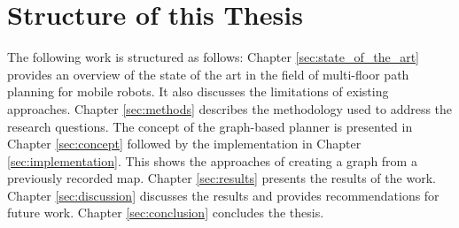 \section{Structure of this Thesis}
\label{sec:structure}
The following work is structured as follows: Chapter \ref{sec:state_of_the_art} provides an overview of the state of the art in the field of multi-floor path planning for mobile robots. It also discusses the limitations of existing approaches. Chapter \ref{sec:methods} describes the methodology used to address the research questions. The concept of the graph-based planner is presented in Chapter \ref{sec:concept} followed by the implementation in Chapter \ref{sec:implementation}. This shows the approaches of creating a graph from a previously recorded map. Chapter \ref{sec:results} presents the results of the work. Chapter \ref{sec:discussion} discusses the results and provides recommendations for future work. Chapter \ref{sec:conclusion} concludes the thesis.